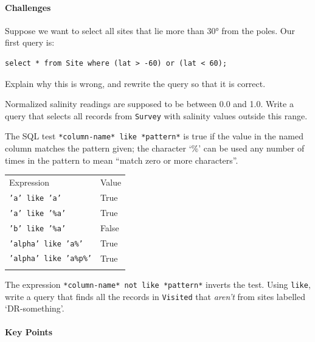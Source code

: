 \documentclass{book}
\begin{document}
\mbox{}\paragraph{Challenges}

\begin{swcenumerate}
\item
  Suppose we want to select all sites that lie more than 30° from the
  poles. Our first query is:

\begin{verbatim}
select * from Site where (lat > -60) or (lat < 60);
\end{verbatim}

  Explain why this is wrong, and rewrite the query so that it is
  correct.
\item
  Normalized salinity readings are supposed to be between 0.0 and 1.0.
  Write a query that selects all records from \texttt{Survey} with
  salinity values outside this range.
\item
  The SQL test \texttt{*column-name* like *pattern*} is true if the
  value in the named column matches the pattern given; the character
  `\%' can be used any number of times in the pattern to mean ``match
  zero or more characters''.

  \begin{tabular}{@{}ll@{}}
  \hline\noalign{\medskip}
  Expression & Value
  \\\noalign{\medskip}
  \hline\noalign{\medskip}
  \texttt{'a' like 'a'} & True
  \\\noalign{\medskip}
  \texttt{'a' like '\%a'} & True
  \\\noalign{\medskip}
  \texttt{'b' like '\%a'} & False
  \\\noalign{\medskip}
  \texttt{'alpha' like 'a\%'} & True
  \\\noalign{\medskip}
  \texttt{'alpha' like 'a\%p\%'} & True
  \\\noalign{\medskip}
  \hline
  \end{tabular}

  The expression \texttt{*column-name* not like *pattern*} inverts the
  test. Using \texttt{like}, write a query that finds all the records in
  \texttt{Visited} that \emph{aren't} from sites labelled
  `DR-something'.
\end{swcenumerate}

\mbox{}\paragraph{Key Points}
\end{document}
